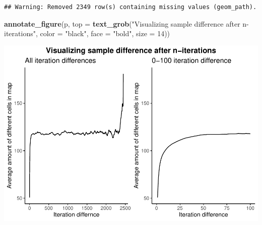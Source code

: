 \documentclass[
]{article}
\newenvironment{Shaded}{\begin{snugshade}}{\end{snugshade}}
\newcommand{\DataTypeTok}[1]{\textcolor[rgb]{0.13,0.29,0.53}{#1}}
\newcommand{\DecValTok}[1]{\textcolor[rgb]{0.00,0.00,0.81}{#1}}
\newcommand{\KeywordTok}[1]{\textcolor[rgb]{0.13,0.29,0.53}{\textbf{#1}}}
\newcommand{\NormalTok}[1]{#1}
\newcommand{\StringTok}[1]{\textcolor[rgb]{0.31,0.60,0.02}{#1}}
\begin{document}
\begin{verbatim}
## Warning: Removed 2349 row(s) containing missing values (geom_path).
\end{verbatim}

\begin{Shaded}
\begin{Highlighting}[]
\KeywordTok{annotate_figure}\NormalTok{(p,}
                \DataTypeTok{top =} \KeywordTok{text_grob}\NormalTok{(}\StringTok{"Visualizing sample difference after n-iterations"}\NormalTok{, }\DataTypeTok{color =} \StringTok{"black"}\NormalTok{, }\DataTypeTok{face =} \StringTok{"bold"}\NormalTok{, }\DataTypeTok{size =} \DecValTok{14}\NormalTok{))}
\end{Highlighting}
\end{Shaded}

\includegraphics{Ex3_files/figure-latex/unnamed-chunk-9-3.pdf}
\end{document}
